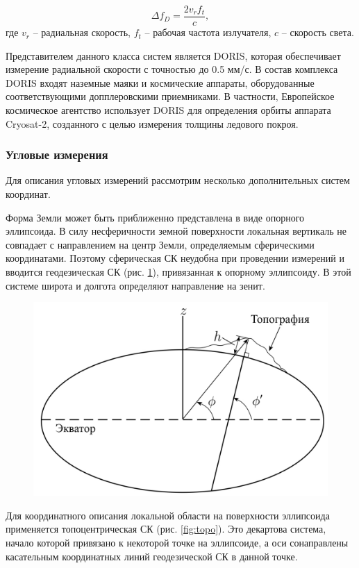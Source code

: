 \begin{equation*}
    \Delta f_D = \frac{2 v_r f_t}{c},
\end{equation*}
где $v_r$ -- радиальная скорость, $f_t$ -- рабочая частота излучателя, $c$ -- скорость света.

Представителем данного класса систем является DORIS,
которая обеспечивает измерение радиальной скорости с точностью до 0.5 мм/с.
В состав комплекса DORIS входят наземные маяки и космические аппараты, 
оборудованные соответствующими допплеровскими приемниками. 
В частности, Европейское космическое агентство 
использует DORIS для определения орбиты аппарата Cryosat-2, 
созданного с целью измерения толщины ледового покроя.

\subsubsection{Угловые измерения}

Для описания угловых измерений рассмотрим несколько дополнительных систем координат.

Форма Земли может быть приближенно представлена в виде опорного эллипсоида.
В силу несферичности земной поверхности локальная вертикаль не совпадает с направлением на центр Земли, определяемым сферическими координатами.
Поэтому сферическая СК неудобна при проведении измерений 
и вводится геодезическая СК (рис. \ref{fig:geodes}), привязанная к опорному эллипсоиду.
В этой системе широта и долгота определяют направление на зенит.

\begin{figure}[h!]
    \hspace*{-1.8cm}
    \centering
    \includegraphics[width=0.5\linewidth]{../images/review/geodes.PNG}
    \label{fig:geodes}
\end{figure}

Для координатного описания локальной области на поверхности эллипсоида
применяется топоцентрическая СК (рис. \ref{fig:topo}). Это декартова система, начало которой привязано к некоторой точке на эллипсоиде,
а оси сонаправлены касательным координатных линий геодезической СК в данной точке.

